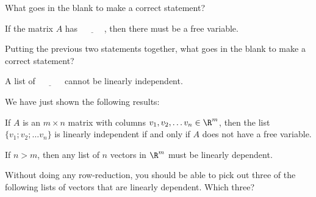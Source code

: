What goes in the blank to make a correct statement?

If the matrix $A$ has $\underline{\;\;\;\;\;\;\;\;\;\;}$, then
there must be a free variable.  



\endedxproblem



Putting the previous two statements together, what goes in the blank to make a correct statement?  

A list of  $\underline{\;\;\;\;\;\;\;\;\;\;}$ cannot be linearly independent.


\endedxproblem




\endedxvertical





We have just shown the following results:  

{}  If $A$ is an $m\times n$ matrix with columns 
$v_1, v_2, \ldots v_n \in \R^m$, then the list $\{v_1; v_2; \ldots v_n\}$ is linearly independent
if and only if $A$ does not have a free variable.  

If $n>m$, then any list of $n$ vectors in $\R^m$ must be linearly dependent.  


\endedxtext






Without doing any row-reduction, you should be able to pick out three of the 
following lists of vectors that are linearly dependent.  Which three?  

